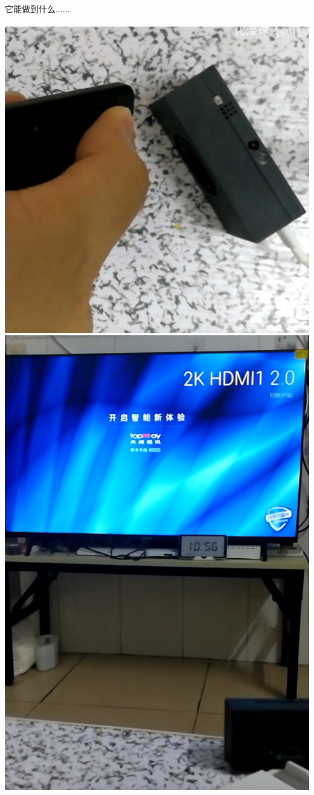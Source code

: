 \documentclass[16pt]{beamer}	%
\begin{document}
		 \begin{frame}
		 	它能做到什么......
		 	\\\hfill\\ \includegraphics [height=0.6\paperheight]{pic/5-5.png}\includegraphics [height=0.6\paperheight]{pic/5-6.png}
		 \end{frame}
\end{document}
